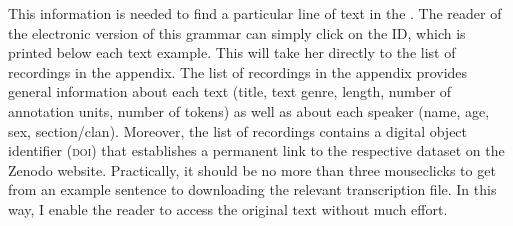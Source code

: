 This information is needed to find a particular line of text in the . The reader of the electronic version of this grammar can simply click on the  ID, which is printed below each text example. This will take her directly to the list of recordings in the appendix. The list of recordings in the appendix provides general information about each text (title, text genre, length, number of annotation units, number of tokens) as well as about each speaker (name, age, sex, section/clan). Moreover, the list of recordings contains a digital object identifier (\textsc{doi}) that establishes a permanent link to the respective dataset on the Zenodo website. Practically, it should be no more than three mouseclicks to get from an example sentence to downloading the relevant transcription file. In this way, I enable the reader to access the original text without much effort.